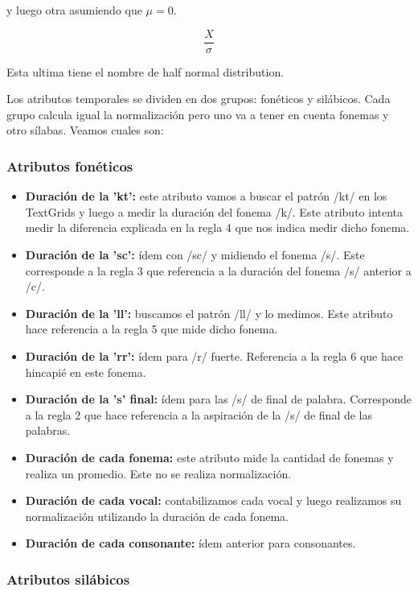 y luego otra asumiendo que $\mu = 0$. 

\hspace{2cm} \[\frac{X}{ \sigma }\]

Esta ultima tiene el nombre de half normal distribution.


Los atributos temporales se dividen en dos grupos: fonéticos y silábicos. Cada grupo calcula igual la normalización pero uno va a tener en cuenta fonemas y otro sílabas. Veamos cuales son:

\subsubsection{Atributos fonéticos}

\begin{itemize}
    \item \textbf{Duración de la 'kt':} este atributo vamos a buscar el patrón /kt/ en los TextGrids y luego a medir la duración del fonema /k/. Este atributo intenta medir la diferencia explicada en la regla 4 que nos indica medir dicho fonema.
    \item \textbf{Duración de la 'sc':} ídem con /sc/ y midiendo el fonema /s/. Este corresponde a la regla 3 que referencia a la duración del fonema /s/ anterior a /c/.  
    \item \textbf{Duración de la 'll':} buscamos el patrón /ll/ y lo medimos. Este atributo hace referencia a la regla 5 que mide dicho fonema.
    \item \textbf{Duración de la 'rr':} ídem para /r/ fuerte. Referencia a la regla 6 que hace hincapié en este fonema.
    \item \textbf{Duración de la 's' final:} ídem para las /s/ de final de palabra. Corresponde a la regla 2 que hace referencia a la aspiración de la /s/ de final de las palabras.  
    \item \textbf{Duración de cada fonema:} este atributo mide la cantidad de fonemas y realiza un promedio. Este no se realiza normalización.  
    \item \textbf{Duración de cada vocal:} contabilizamos cada vocal y luego realizamos su normalización utilizando la duración de cada fonema.
    \item \textbf{Duración de cada consonante:} ídem anterior para consonantes. 
\end{itemize}

\subsubsection{Atributos silábicos}

